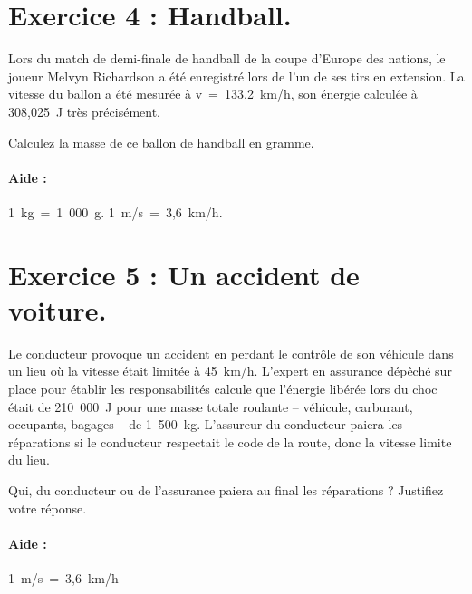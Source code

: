 \documentclass[12pt,a4paper]{article}
\begin{document}
\section*{Exercice 4 : Handball.}
Lors du match de demi-finale de handball de la coupe d'Europe des nations, le joueur Melvyn Richardson a été enregistré lors de l'un de ses tirs en extension. La vitesse du ballon a été mesurée à v~=~133,2~km/h, son énergie calculée à 308,025~J très précisément.

Calculez la masse de ce ballon de handball en gramme.

\paragraph{Aide :} \hfill 1~kg~=~1~000~g. \hfill 1~m/s~=~3,6~km/h. \hfill ~

\section*{Exercice 5 : Un accident de voiture.}
Le conducteur provoque un accident en perdant le contrôle de son véhicule dans un lieu où la vitesse était limitée à 45~km/h. 
L'expert en assurance dépêché sur place pour établir les responsabilités calcule que l'énergie libérée lors du choc était de 210~000~J pour une masse totale roulante -- véhicule, carburant, occupants, bagages -- de 1~500~kg. 
L'assureur du conducteur paiera les réparations si le conducteur respectait le code de la route, donc la vitesse limite du lieu.

Qui, du conducteur ou de l'assurance paiera au final les réparations ? Justifiez votre réponse.

\paragraph*{Aide :} 1~m/s~=~3,6~km/h

\vfill
\renewcommand{\baselinestretch}{1}
\setlength{\parskip}{0em}
\tableofcontents
\end{document}
